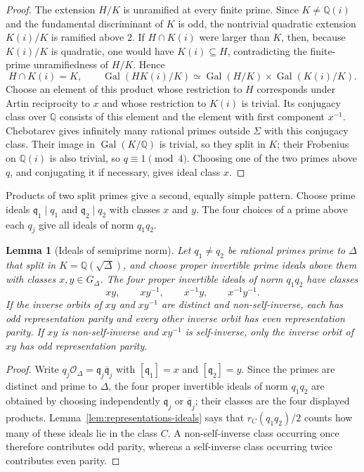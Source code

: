 \documentclass[11pt]{amsart}
\newtheorem{lemma}[theorem]{Lemma}
\theoremstyle{definition}
\theoremstyle{remark}
\newcommand{\Q}{\mathbb{Q}}
\newcommand{\OO}{\mathcal{O}}
\newcommand{\Gal}{\operatorname{Gal}}
\begin{document}
\begin{proof}
The extension $H/K$ is unramified at every finite prime. Since $K\ne\Q(i)$ and the fundamental discriminant of $K$ is odd, the nontrivial quadratic extension $K(i)/K$ is ramified above $2$. If $H\cap K(i)$ were larger than $K$, then, because $K(i)/K$ is quadratic, one would have $K(i)\subseteq H$, contradicting the finite-prime unramifiedness of $H/K$. Hence
\[
  H\cap K(i)=K,
  \qquad
  \Gal(HK(i)/K)\simeq
  \Gal(H/K)\times\Gal(K(i)/K).
\]
Choose an element of this product whose restriction to $H$ corresponds under Artin reciprocity to $x$ and whose restriction to $K(i)$ is trivial. Its conjugacy class over $\Q$ consists of this element and the element with first component $x^{-1}$. Chebotarev gives infinitely many rational primes outside $\Sigma$ with this conjugacy class. Their image in $\Gal(K/\Q)$ is trivial, so they split in $K$; their Frobenius on $\Q(i)$ is also trivial, so $q\equiv1\pmod4$. Choosing one of the two primes above $q$, and conjugating it if necessary, gives ideal class $x$.
\end{proof}

Products of two split primes give a second, equally simple pattern.  Choose prime ideals $\mathfrak q_1\mid q_1$ and $\mathfrak q_2\mid q_2$ with classes $x$ and $y$.  The four choices of a prime above each $q_j$ give all ideals of norm $q_1q_2$.

\begin{lemma}[Ideals of semiprime norm]\label{lem:four-ideals}
Let $q_1\ne q_2$ be rational primes prime to $\Delta$ that split in $K=\Q(\sqrt\Delta)$, and choose proper invertible prime ideals above them with classes $x,y\in G_\Delta$. The four proper invertible ideals of norm $q_1q_2$ have classes
\[
  xy,\qquad xy^{-1},\qquad x^{-1}y,\qquad x^{-1}y^{-1}.
\]
If the inverse orbits of $xy$ and $xy^{-1}$ are distinct and non-self-inverse, each has odd representation parity and every other inverse orbit has even representation parity. If $xy$ is non-self-inverse and $xy^{-1}$ is self-inverse, only the inverse orbit of $xy$ has odd representation parity.
\end{lemma}

\begin{proof}
Write $q_j\OO_\Delta=\mathfrak q_j\overline{\mathfrak q}_j$ with $[\mathfrak q_1]=x$ and $[\mathfrak q_2]=y$. Since the primes are distinct and prime to $\Delta$, the four proper invertible ideals of norm $q_1q_2$ are obtained by choosing independently $\mathfrak q_j$ or $\overline{\mathfrak q}_j$; their classes are the four displayed products. Lemma~\ref{lem:representations-ideals} says that $r_C(q_1q_2)/2$ counts how many of these ideals lie in the class $C$. A non-self-inverse class occurring once therefore contributes odd parity, whereas a self-inverse class occurring twice contributes even parity.
\end{proof}
\end{document}
